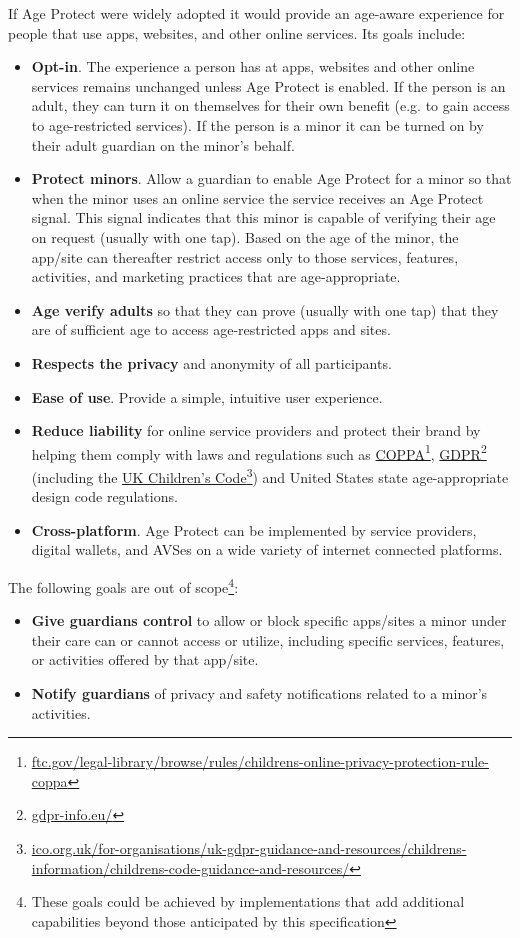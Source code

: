 \documentclass[11pt, oneside]{article}   	%
\newcommand{\hyperfootnote}[1][]{\def\ArgI{{#1}}\hyperfootnoteRelay}
\newcommand\hyperfootnoteRelay[2][]{\href{#1#2}{\ArgI}\footnote{\href{#1#2}{#2}}}
\begin{document}
If Age Protect were widely adopted it would provide an age-aware experience for people that use apps, websites, and other online services. Its goals include:
\begin{itemize}
	\item \textbf{Opt-in}. The experience a person has at apps, websites and other online services remains unchanged unless Age Protect is enabled. If the person is an adult, they can turn it on themselves for their own benefit (e.g. to gain access to age-restricted services). If the person is a minor it can be turned on by their adult guardian on the minor's behalf. 
	\item \textbf{Protect minors}. Allow a guardian to enable Age Protect for a minor so that when the minor uses an online service the service receives an Age Protect signal. This signal indicates that this minor is capable of verifying their age on request (usually with one tap). Based on the age of the minor, the app/site can thereafter restrict access only to those services, features, activities, and marketing practices that are age-appropriate.
	\item \textbf{Age verify adults} so that they can prove (usually with one tap) that they are of sufficient age to access age-restricted apps and sites.
	\item \textbf{Respects the privacy} and anonymity of all participants.
	\item \textbf{Ease of use}. Provide a simple, intuitive user experience.
	\item \textbf{Reduce liability} for online service providers and protect their brand by helping them comply with laws and regulations such as \hyperfootnote[COPPA][https:]{ftc.gov/legal-library/browse/rules/childrens-online-privacy-protection-rule-coppa}, \hyperfootnote[GDPR][https://]{gdpr-info.eu/} (including the \hyperfootnote[UK Children's Code][https://]{ico.org.uk/for-organisations/uk-gdpr-guidance-and-resources/childrens-information/childrens-code-guidance-and-resources/}) and United States state age-appropriate design code regulations.
	\item \textbf{Cross-platform}. Age Protect can be implemented by service providers, digital wallets, and AVSes on a wide variety of internet connected platforms.
\end{itemize}
The following goals are out of scope\footnote{These goals could be achieved by implementations that add additional capabilities beyond those anticipated by this specification}:
\begin{itemize}
	\item \textbf{Give guardians control} to allow or block specific apps/sites a minor under their care can or cannot access or utilize, including specific services, features, or activities offered by that app/site.
	\item \textbf{Notify guardians} of privacy and safety notifications related to a minor's activities.
\end{itemize}
\end{document}
